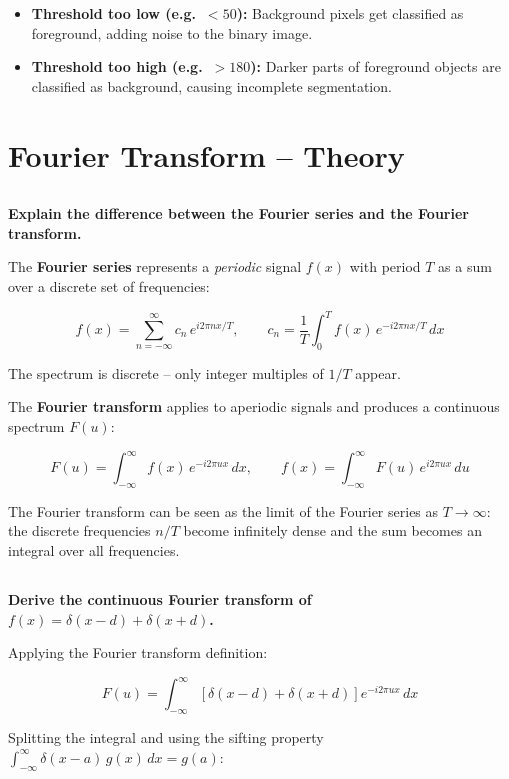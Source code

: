 \documentclass[12pt]{article} %
\begin{document}
\begin{itemize}
    \item \textbf{Threshold too low (e.g.\ $< 50$):} Background pixels get classified as foreground, adding noise to the binary image.
    \item \textbf{Threshold too high (e.g.\ $> 180$):} Darker parts of foreground objects are classified as background, causing incomplete segmentation.
\end{itemize}

\section{Fourier Transform -- Theory}

\subsection{}
\textbf{Explain the difference between the Fourier series and the Fourier transform.}

The \textbf{Fourier series} represents a \textit{periodic} signal $f(x)$ with period $T$ as a sum over a discrete set of frequencies:

$$f(x) = \sum_{n=-\infty}^{\infty} c_n \, e^{i 2\pi n x / T}, \qquad c_n = \frac{1}{T}\int_{0}^{T} f(x)\, e^{-i 2\pi n x / T}\, dx$$

The spectrum is discrete -- only integer multiples of $1/T$ appear.

The \textbf{Fourier transform} applies to aperiodic signals and produces a continuous spectrum $F(u)$:

$$F(u) = \int_{-\infty}^{\infty} f(x)\, e^{-i 2\pi u x}\, dx, \qquad f(x) = \int_{-\infty}^{\infty} F(u)\, e^{i 2\pi u x}\, du$$

The Fourier transform can be seen as the limit of the Fourier series as $T \to \infty$: the discrete frequencies $n/T$ become infinitely dense and the sum becomes an integral over all frequencies.

\subsection{}
\textbf{Derive the continuous Fourier transform of $f(x) = \delta(x-d) + \delta(x+d)$.}

Applying the Fourier transform definition:

$$F(u) = \int_{-\infty}^{\infty} \left[\delta(x-d) + \delta(x+d)\right] e^{-i 2\pi u x}\, dx$$

Splitting the integral and using the sifting property $\int_{-\infty}^{\infty} \delta(x-a)\, g(x)\, dx = g(a)$:
\end{document}
